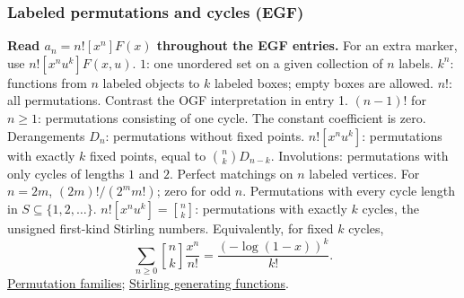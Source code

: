 \subsubsection*{Labeled permutations and cycles (EGF)}
\textbf{Read $a_n=n![x^n]F(x)$ throughout the EGF entries.}
For an extra marker, use $n![x^nu^k]F(x,u)$.
  {$1$: one unordered set on a given collection of $n$ labels.}
  {$k^n$: functions from $n$ labeled objects to $k$ labeled boxes; empty boxes are allowed.}
  {$n!$: all permutations. Contrast the OGF interpretation in entry 1.}
  {$(n-1)!$ for $n\ge1$: permutations consisting of one cycle. The constant coefficient is zero.}
  {Derangements $D_n$: permutations without fixed points.}
  {$n![x^nu^k]$: permutations with exactly $k$ fixed points, equal to $\binom{n}{k}D_{n-k}$.}
  {Involutions: permutations with only cycles of lengths $1$ and $2$.}
  {Perfect matchings on $n$ labeled vertices. For $n=2m$, $(2m)!/(2^m m!)$; zero for odd $n$.}
  {Permutations with every cycle length in $S\subseteq\{1,2,\ldots\}$.}
  {$n![x^nu^k]={n\brack k}$: permutations with exactly $k$ cycles, the unsigned first-kind Stirling numbers.}
Equivalently, for fixed $k$ cycles,
\[
  \sum_{n\ge0}{n\brack k}\frac{x^n}{n!}
  =\frac{(-\log(1-x))^k}{k!}.
\]
\href{https://aofa.cs.princeton.edu/70permutations/}{Permutation families};
\href{https://dlmf.nist.gov/26.8}{Stirling generating functions}.

